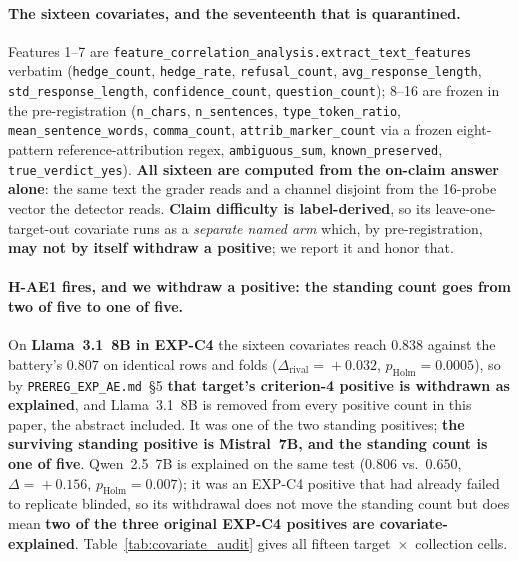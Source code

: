 \paragraph{The sixteen covariates, and the seventeenth that is quarantined.} Features 1--7 are \texttt{feature\_correlation\_analysis.extract\_text\_features} verbatim (\texttt{hedge\_count}, \texttt{hedge\_rate}, \texttt{refusal\_count}, \texttt{avg\_response\_length}, \texttt{std\_response\_length}, \texttt{confidence\_count}, \texttt{question\_count}); 8--16 are frozen in the pre-registration (\texttt{n\_chars}, \texttt{n\_sentences}, \texttt{type\_token\_ratio}, \texttt{mean\_sentence\_words}, \texttt{comma\_count}, \texttt{attrib\_marker\_count} via a frozen eight-pattern reference-attribution regex, \texttt{ambiguous\_sum}, \texttt{known\_preserved}, \texttt{true\_verdict\_yes}). \textbf{All sixteen are computed from the on-claim answer alone}: the same text the grader reads and a channel disjoint from the 16-probe vector the detector reads. \textbf{Claim difficulty is label-derived}, so its leave-one-target-out covariate runs as a \emph{separate named arm} which, by pre-registration, \textbf{may not by itself withdraw a positive}; we report it and honor that.

\paragraph{H-AE1 fires, and we withdraw a positive: the standing count goes from two of five to \textbf{one of five}.} On \textbf{Llama~3.1~8B in EXP-C4} the sixteen covariates reach $0.838$ against the battery's $0.807$ on identical rows and folds ($\Delta_{\mathrm{rival}}\!=\!+0.032$, $p_{\mathrm{Holm}}\!=\!0.0005$), so by \texttt{PREREG\_EXP\_AE.md}~\S5 \textbf{that target's criterion-4 positive is withdrawn as explained}, and Llama~3.1~8B is removed from every positive count in this paper, the abstract included. It was one of the two standing positives; \textbf{the surviving standing positive is Mistral~7B, and the standing count is one of five}. Qwen~2.5~7B is explained on the same test ($0.806$ vs.\ $0.650$, $\Delta\!=\!+0.156$, $p_{\mathrm{Holm}}\!=\!0.007$); it was an EXP-C4 positive that had already failed to replicate blinded, so its withdrawal does not move the standing count but does mean \textbf{two of the three original EXP-C4 positives are covariate-explained}. Table~\ref{tab:covariate_audit} gives all fifteen target~$\times$~collection cells.

